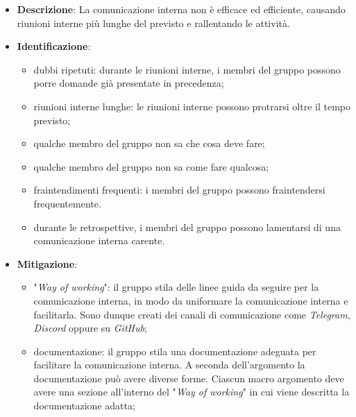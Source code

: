 \label{risk:comunicazione interna carente}
\begin{itemize}
	\item \textbf{Descrizione}:
	      La comunicazione interna non è efficace ed efficiente, causando riunioni
	      interne più lunghe del previsto e rallentando le attività.
	\item \textbf{Identificazione}:
	      \begin{itemize}
		      \item dubbi ripetuti: durante le riunioni interne, i membri del
		            gruppo possono porre domande già presentate in precedenza;

		      \item riunioni interne lunghe: le riunioni interne possono
		            protrarsi oltre il tempo previsto;

		      \item qualche membro del gruppo non sa che cosa deve fare;

		      \item qualche membro del gruppo non sa come fare qualcosa;

		      \item fraintendimenti frequenti: i membri del gruppo possono
		            fraintendersi frequentemente.

		      \item durante le retrospettive, i membri del gruppo possono
		            lamentarsi di una comunicazione interna carente.
	      \end{itemize}
	\item \textbf{Mitigazione}:
	      \begin{itemize}
		      \item "\textit{Way of working}": il gruppo stila delle linee guida
		            da seguire per la comunicazione interna, in modo da
		            uniformare la comunicazione interna e facilitarla. Sono
		            dunque creati dei canali di comunicazione come
		            \textit{Telegram}, \textit{Discord} oppure su
		            \textit{GitHub};

		      \item documentazione: il gruppo stila una documentazione
		            adeguata per facilitare la comunicazione interna. A seconda
		            dell'argomento la documentazione può avere diverse forme.
		            Ciascun macro argomento deve avere una sezione all'interno
		            del "\textit{Way of working}" in cui viene descritta la
		            documentazione adatta;


\end{itemize}
\end{itemize}
